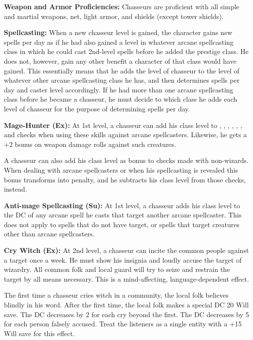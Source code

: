 {
\textbf{Weapon and Armor Proficiencies:} Chasseurs are proficient with all simple and martial weapons, net, light armor, and shields (except tower shields).

\textbf{Spellcasting:} When a new chasseur level is gained, the character gains new spells per day as if he had also gained a level in whatever arcane spellcasting class in which he could cast 2nd-level spells before he added the prestige class. He does not, however, gain any other benefit a character of that class would have gained. This essentially means that he adds the level of chasseur to the level of whatever other arcane spellcasting class he has, and then determines spells per day and caster level accordingly. If he had more than one arcane spellcasting class before he became a chasseur, he must decide to which class he adds each level of chasseur for the purpose of determining spells per day.

\textbf{Mage-Hunter (Ex):} At 1st level, a chasseur can add his class level to , , , , , , and  checks when using these skills against arcane spellcasters. Likewise, he gets a +2 bonus on weapon damage rolls against such creatures.

A chasseur can also add his class level as bonus to  checks made with non-wizards. When dealing with arcane spellcasters or when his spellcasting is revealed this bonus transforms into penalty, and he subtracts his class level from those checks, instead.

\textbf{Anti-mage Spellcasting (Su):} At 1st level, a chasseur adds his class level to the DC of any arcane spell he casts that target another arcane spellcaster. This does not apply to spells that do not have target, or spells that target creatures other than arcane spellcasters.

\textbf{Cry Witch (Ex):} At 2nd level, a chasseur can incite the common people against a target once a week. He must show his insignia and loudly accuse the target of wizardry. All common folk and local guard will try to seize and restrain the target by all means necessary. This is a mind-affecting, language-dependent effect.

The first time a chasseur cries witch in a community, the local folk believes blindly in his word. After the first time, the local folk makes a special DC 20 Will save. The DC decreases by 2 for each cry beyond the first. The DC decreases by 5 for each person falsely accused. Treat the listeners as a single entity with a +15 Will save for this effect.

}
